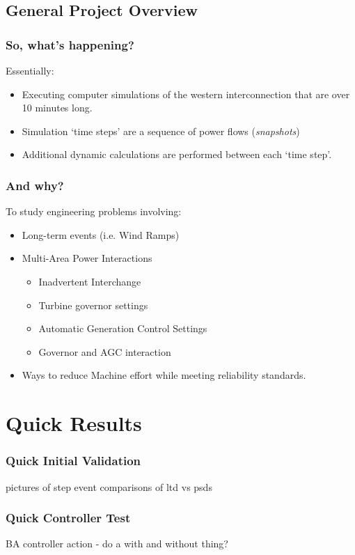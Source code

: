 \documentclass[14pt, unknownkeysallowed]{beamer}
\begin{document}
\subsection{General Project Overview}
\begin{frame}
\frametitle{So, what's happening?}
Essentially:
\begin{itemize}
	\item Executing computer simulations of the western interconnection that are  over 10 minutes long.
	\item Simulation `time steps' are a sequence of power flows (\emph{snapshots})
	\item Additional dynamic calculations are performed between each `time step'.
\end{itemize}

\end{frame}
\begin{frame}
\frametitle{And why?}
To study engineering problems involving:
\begin{itemize}
	\item Long-term events (i.e. Wind Ramps)
	\item Multi-Area Power Interactions
	\begin{itemize}
		\item Inadvertent Interchange
		\item Turbine governor settings
		\item Automatic Generation Control Settings
		\item Governor and AGC interaction
	\end{itemize}
	\item Ways to reduce Machine effort while meeting reliability standards.
\end{itemize}
\end{frame}
\section{Quick Results}
\begin{frame}
\frametitle{Quick Initial Validation}
pictures of step event comparisons of ltd vs psds
\end{frame}
\begin{frame}
\frametitle{Quick Controller Test}
BA controller action - do a with and without thing?
\end{frame}
\end{document}
